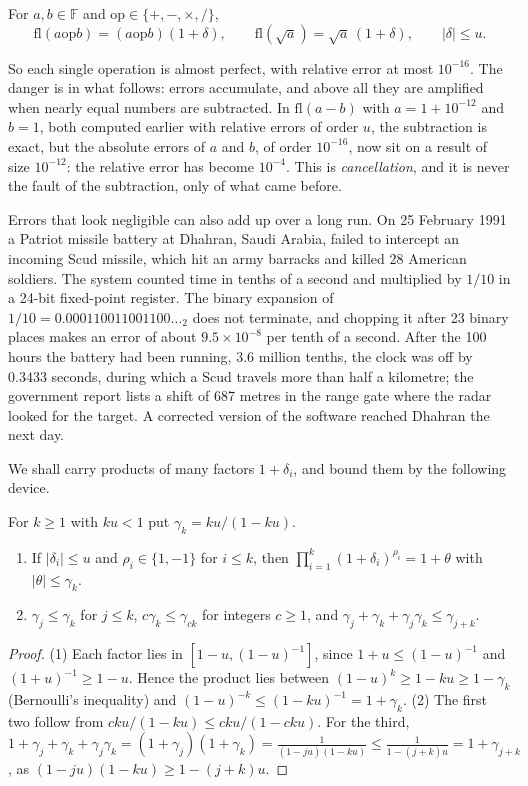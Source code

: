 \begin{definition}\label{def:model}
For $a,b\in\mathbb F$ and $\mathrm{op}\in\{+,-,\times,/\}$,
\[
\mathrm{fl}(a\mathbin{\mathrm{op}}b)=(a\mathbin{\mathrm{op}}b)(1+\delta),\qquad\mathrm{fl}(\sqrt a)=\sqrt a\,(1+\delta),\qquad|\delta|\le u.
\]
\end{definition}

So each single operation is almost perfect, with relative error at most $10^{-16}$. The danger is in what follows: errors accumulate, and above all
they are amplified when nearly equal numbers are subtracted. In $\mathrm{fl}(a-b)$ with $a=1+10^{-12}$ and $b=1$, both computed earlier with relative
errors of order $u$, the subtraction is exact, but the absolute errors of $a$ and $b$, of order $10^{-16}$, now sit on a result of size $10^{-12}$: the
relative error has become $10^{-4}$. This is \emph{cancellation}, and it is never the fault of the subtraction, only of what came before.

Errors that look negligible can also add up over a long run. On 25 February 1991 a Patriot missile battery at Dhahran, Saudi Arabia, failed to
intercept an incoming Scud missile, which hit an army barracks and killed 28 American soldiers. The system counted time in tenths of a second and
multiplied by $1/10$ in a 24-bit fixed-point register. The binary expansion of $1/10=0.000110011001100\dots_2$ does not terminate, and chopping it after
23 binary places makes an error of about $9.5\times10^{-8}$ per tenth of a second. After the 100 hours the battery had been running, $3.6$ million
tenths, the clock was off by $0.3433$ seconds, during which a Scud travels more than half a kilometre; the government report lists a shift of 687
metres in the range gate where the radar looked for the target. A corrected version of the software reached Dhahran the next day.

We shall carry products of many factors $1+\delta_i$, and bound them by the following device.

\begin{lemma}\label{lem:gamma}
For $k\ge1$ with $ku<1$ put $\gamma_k=ku/(1-ku)$.
\begin{enumerate}
\item If $|\delta_i|\le u$ and $\rho_i\in\{1,-1\}$ for $i\le k$, then $\prod_{i=1}^k(1+\delta_i)^{\rho_i}=1+\theta$ with $|\theta|\le\gamma_k$.
\item $\gamma_j\le\gamma_k$ for $j\le k$, $c\gamma_k\le\gamma_{ck}$ for integers $c\ge1$, and $\gamma_j+\gamma_k+\gamma_j\gamma_k\le\gamma_{j+k}$.
\end{enumerate}
\end{lemma}
\begin{proof}
(1) Each factor lies in $[1-u,(1-u)^{-1}]$, since $1+u\le(1-u)^{-1}$ and $(1+u)^{-1}\ge1-u$. Hence the product lies between $(1-u)^k\ge1-ku\ge1-\gamma_k$
(Bernoulli's inequality) and $(1-u)^{-k}\le(1-ku)^{-1}=1+\gamma_k$. (2) The first two follow from $ck u/(1-ku)\le cku/(1-cku)$. For the third,
$1+\gamma_j+\gamma_k+\gamma_j\gamma_k=(1+\gamma_j)(1+\gamma_k)=\frac1{(1-ju)(1-ku)}\le\frac1{1-(j+k)u}=1+\gamma_{j+k}$, as $(1-ju)(1-ku)\ge1-(j+k)u$.
\end{proof}

